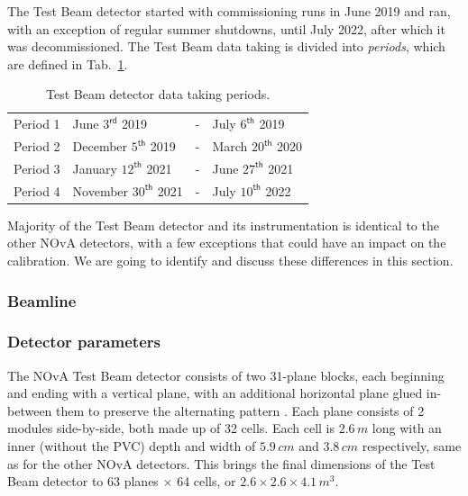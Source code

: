 
The Test Beam detector started with commissioning runs in June 2019 and ran, with an exception of regular summer shutdowns, until July 2022, after which it was decommissioned. The Test Beam data taking is divided into \textit{periods}, which are defined in Tab.~\ref{tab:TestBeamPeriods}.
\begin{table}[!ht]
\centering
\caption{Test Beam detector data taking periods.}
\def\arraystretch{1.4}
\begin{tabular}{l@{\hskip 1in}lcl}
Period 1 & June $3^{\textsf{rd}}$ 2019 & - & July $6^{\textsf{th}}$ 2019\\
Period 2 & December $5^{\textsf{th}}$ 2019 & - & March $20^{\textsf{th}}$ 2020\\
Period 3 & January $12^{\textsf{th}}$ 2021 & - & June $27^{\textsf{th}}$ 2021\\
Period 4 & November $30^{\textsf{th}}$ 2021 & - & July $10^{\textsf{th}}$ 2022
\end{tabular}
\label{tab:TestBeamPeriods}
\end{table}

Majority of the Test Beam detector and its instrumentation is identical to the other \gls{NOvA} detectors, with a few exceptions that could have an impact on the calibration. We are going to identify and discuss these differences in this section.


\subsubsection*{Beamline}

\subsubsection*{Detector parameters}
The \gls{NOvA} Test Beam detector consists of two 31-plane blocks, each beginning and ending with a vertical plane, with an additional horizontal plane glued in-between them to preserve the alternating pattern \cite{NOvA-doc-29543}. Each plane consists of 2 modules side-by-side, both made up of 32 cells. Each cell is $2.6\,\unit{m}$ long with an inner (without the PVC) depth and width of $5.9\,\unit{cm}$ and $3.8\,\unit{cm}$ respectively, same as for the other \gls{NOvA} detectors. This brings the final dimensions of the Test Beam detector to 63 planes $\times$ 64 cells, or $2.6\times 2.6\times 4.1\,\unit{m^3}$.

